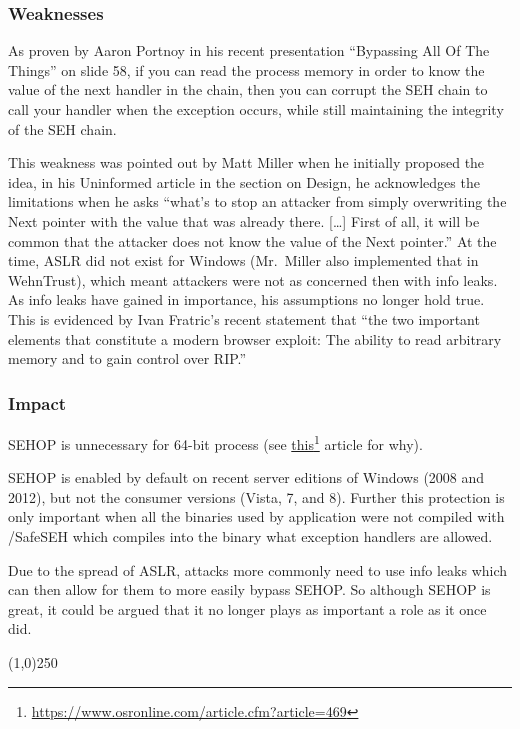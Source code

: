 \documentclass[]{article}
\newcommand{\fhref}[2]{\href{#1}{#2}\footnote{\url{#1}}}
\newcommand{\sectionbreakline}[0]{\begin{center}\line(1,0){250}\end{center}}
\begin{document}
\subsubsection{Weaknesses}
As proven by Aaron Portnoy in his recent presentation ``Bypassing All Of
The Things''\cite{bypass_all_the_things} on slide 58, if you can read the process memory in order to know the value of the next handler in the chain, then you can corrupt the SEH chain to call your handler when the exception occurs, while still maintaining the integrity of the SEH chain. 

This weakness was pointed out by Matt Miller when he initially proposed the idea, in
his Uninformed article in the section on Design, he acknowledges the limitations when he asks ``what's to stop an attacker from simply overwriting the Next pointer with the value that was already there.
{[}\ldots{}{]} First of all, it will be common that the attacker does
not know the value of the Next pointer.'' At the time, ASLR did not
exist for Windows (Mr.~Miller also implemented that in WehnTrust), which
meant attackers were not as concerned then with info leaks. As info
leaks have gained in importance, his assumptions no longer hold true.  This is evidenced by Ivan Fratric's recent statement that ``the two important elements that constitute a modern browser exploit: The ability to read arbitrary memory and to gain control over RIP.''\cite{ie11}

\subsubsection{Impact}
SEHOP is unnecessary for 64-bit process (see \fhref{https://www.osronline.com/article.cfm?article=469}{this}\cite{seh64} article for why).  

SEHOP is enabled by default on recent server editions of Windows (2008 and 2012), but not the consumer versions (Vista, 7, and 8).  Further this protection is only important when all the binaries used by application were not compiled with /SafeSEH which compiles into the binary what exception handlers are allowed.

Due to the spread of ASLR, attacks more commonly need to use info leaks
which can then allow for them to more easily bypass SEHOP. So although
SEHOP is great, it could be argued that it no longer plays as important
a role as it once did.

\sectionbreakline{}
\end{document}
